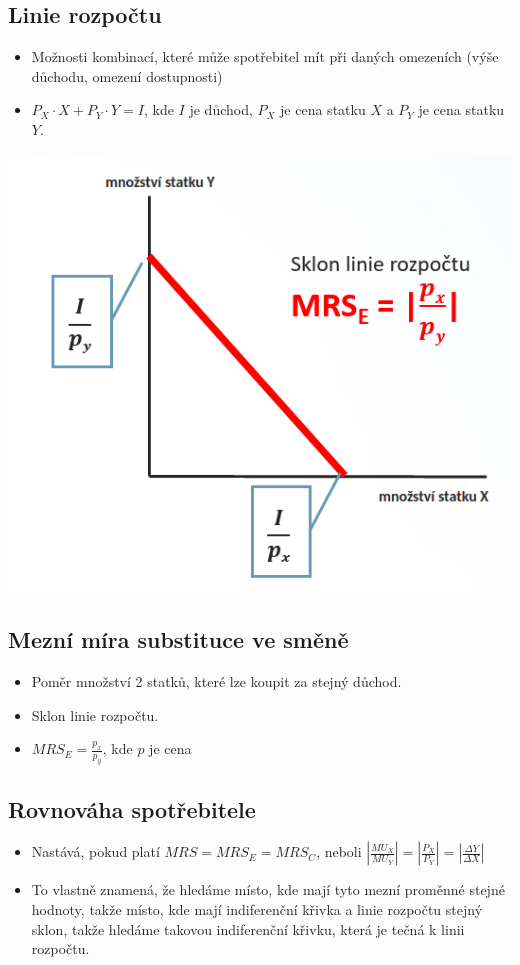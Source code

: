 \subsection{Linie rozpočtu}
\begin{itemize}
    \item Možnosti kombinací, které může spotřebitel mít při daných omezeních (výše důchodu, omezení dostupnosti)
    \item $P_X \cdot X+P_Y \cdot Y = I$, kde $I$ je důchod, $P_X$ je cena statku $X$
    a $P_Y$ je cena statku $Y$.
\end{itemize}
\includegraphics[width=16cm]{images/pr_spotr_m.png}

\subsection{Mezní míra substituce ve směně}
\begin{itemize}
    \item Poměr množství 2 statků, které lze koupit za stejný důchod.
    \item Sklon linie rozpočtu.
    \item $MRS_E=\frac{p_x}{p_y}$, kde $p$ je cena
\end{itemize}

\subsection{Rovnováha spotřebitele}
\begin{itemize}
    \item Nastává, pokud platí $MRS=MRS_E=MRS_C$, neboli $|\frac{MU_X}{MU_Y}|=|\frac{P_X}{P_Y}|=|\frac{\Delta Y}{\Delta X}|$
    \item To vlastně znamená, že hledáme místo, kde mají tyto mezní proměnné stejné hodnoty, takže místo, kde mají indiferenční křivka a linie rozpočtu stejný sklon, takže hledáme takovou indiferenční křivku, která je tečná k linii rozpočtu.
\end{itemize}

